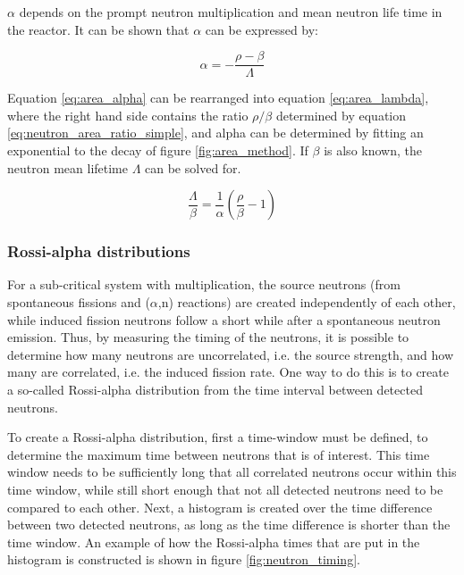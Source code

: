  $\alpha$ depends on the prompt neutron multiplication and mean neutron life time in the reactor. It can be shown that $\alpha$ can be expressed by:

\begin{equation} \label{eq:area_alpha}
\alpha = - \frac{\rho - \beta}{\Lambda}
\end{equation} 

Equation \ref{eq:area_alpha} can be rearranged into equation \ref{eq:area_lambda}, where the right hand side contains the ratio $\rho/\beta$ determined by equation \ref{eq:neutron_area_ratio_simple}, and alpha can be determined by fitting an exponential to the decay of figure \ref{fig:area_method}. If $\beta$ is also known, the neutron mean lifetime $\Lambda$ can be solved for.

\begin{equation} \label{eq:area_lambda}
\frac{\Lambda}{\beta} = \frac{1}{\alpha}(\frac{\rho}{\beta}-1)
\end{equation} 

\subsubsection{Rossi-alpha distributions}

For a sub-critical system with multiplication, the source neutrons (from spontaneous fissions and ($\alpha$,n) reactions) are created independently of each other, while induced fission neutrons follow a short while after a spontaneous neutron emission. Thus, by measuring the timing of the neutrons, it is possible to determine how many neutrons are uncorrelated, i.e. the source strength, and how many are correlated, i.e. the induced fission rate. One way to do this is to create a so-called Rossi-alpha distribution from the time interval between detected neutrons. 

To create a Rossi-alpha distribution, first a time-window must be defined, to determine the maximum time between neutrons that is of interest. This time window needs to be sufficiently long that all correlated neutrons occur within this time window, while still short enough that not all detected neutrons need to be compared to each other. Next, a histogram is created over the time difference between two detected neutrons, as long as the time difference is shorter than the time window. An example of how the Rossi-alpha times that are put in the histogram is constructed is shown in figure \ref{fig:neutron_timing}.

